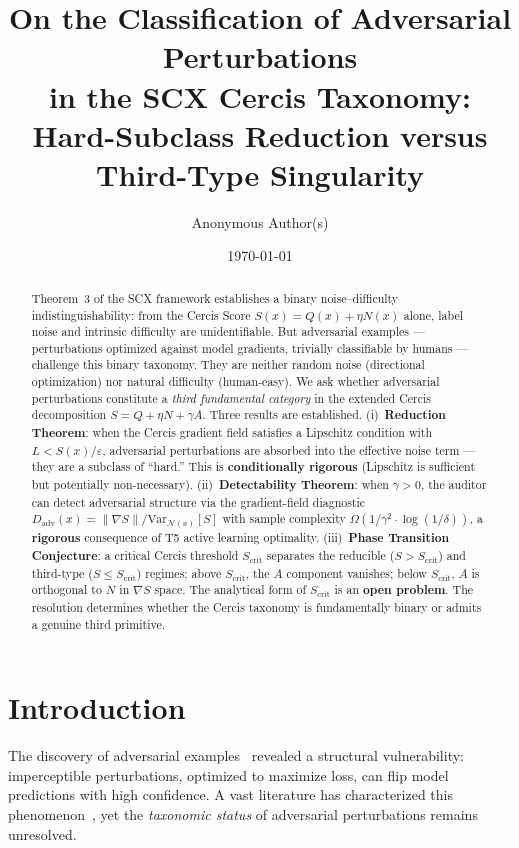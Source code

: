 \documentclass[12pt,a4paper]{article}
\title{\bfseries On the Classification of Adversarial Perturbations\\
in the SCX Cercis Taxonomy:\\
Hard-Subclass Reduction versus Third-Type Singularity}
\author{Anonymous Author(s)}
\date{\today}
\newcommand{\cN}{\mathcal{N}}
\begin{document}
\maketitle

\begin{abstract}
Theorem~3 of the SCX framework establishes a binary noise--difficulty
indistinguishability: from the Cercis Score $S(x) = Q(x) + \eta N(x)$
alone, label noise and intrinsic difficulty are unidentifiable.  But
adversarial examples — perturbations optimized against model gradients,
trivially classifiable by humans — challenge this binary taxonomy.  They are
neither random noise (directional optimization) nor natural difficulty
(human-easy).  We ask whether adversarial perturbations constitute a
\emph{third fundamental category} in the extended Cercis decomposition
$S = Q + \eta N + \gamma A$.  Three results are established.
(i)~\textbf{Reduction Theorem}: when the Cercis gradient field satisfies a
Lipschitz condition with $L < S(x)/\varepsilon$, adversarial perturbations
are absorbed into the effective noise term — they are a subclass of
``hard.''  This is \textbf{conditionally rigorous} (Lipschitz is sufficient
but potentially non-necessary).  (ii)~\textbf{Detectability Theorem}: when
$\gamma > 0$, the auditor can detect adversarial structure via the
gradient-field diagnostic $D_{\mathrm{adv}}(x) = \|\nabla S\| /
\mathrm{Var}_{\cN(x)}[S]$ with sample complexity
$\Omega(1/\gamma^2 \cdot \log(1/\delta))$, a \textbf{rigorous} consequence
of T5 active learning optimality.  (iii)~\textbf{Phase Transition
Conjecture}: a critical Cercis threshold $S_{\mathrm{crit}}$ separates
the reducible ($S > S_{\mathrm{crit}}$) and third-type ($S \leq
S_{\mathrm{crit}}$) regimes; above $S_{\mathrm{crit}}$, the $A$ component
vanishes; below $S_{\mathrm{crit}}$, $A$ is orthogonal to $N$ in $\nabla S$
space.  The analytical form of $S_{\mathrm{crit}}$ is an \textbf{open
problem}.  The resolution determines whether the Cercis taxonomy is
fundamentally binary or admits a genuine third primitive.
\end{abstract}

\section{Introduction}

The discovery of adversarial examples~\citep{szegedy2014intriguing,
goodfellow2015explaining} revealed a structural vulnerability: imperceptible
perturbations, optimized to maximize loss, can flip model predictions with
high confidence.  A vast literature has characterized this
phenomenon~\citep{madry2018towards, tsipras2019robustness,
ilyas2019adversarial, carlini2017towards}, yet the \emph{taxonomic status}
of adversarial perturbations remains unresolved.
\end{document}
